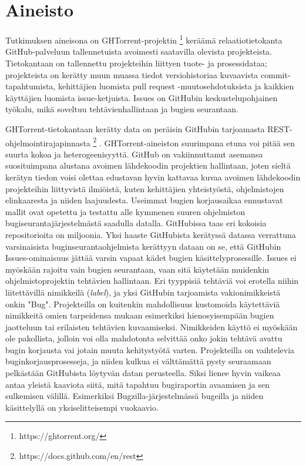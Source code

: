 \documentclass[utf8]{gradu3}
\begin{document}
\section{Aineisto}
Tutkimuksen aineisona on GHTorrent-projektin \footnote{https://ghtorrent.org/}
\parencite{Gousi13} keräämä relaatiotietokanta GitHub-palveluun tallennetuista
avoimesti saatavilla olevista projekteista. Tietokantaan on tallennettu
projekteihin liittyen tuote- ja prosessidataa; projekteista on kerätty muun
muassa tiedot versiohistoriaa kuvaavista commit-tapahtumista, kehittäjien
luomista pull request -muutosehdotuksista ja kaikkien käyttäjien luomista
issue-ketjuista. Issues on GitHubin keskustelupohjainen työkalu, mikä soveltuu
tehtävienhallintaan ja bugien seurantaan.

GHTorrent-tietokantaan kerätty data on peräisin GitHubin tarjoamasta
REST-ohjelmointirajapinnasta \footnote{https://docs.github.com/en/rest}
\parencite{Gousi13}. GHTorrent-aineiston suurimpana etuna voi pitää sen suurta
kokoa ja heterogeenisyyttä. GitHub on vakiinnuttanut asemansa suosituimpana
alustana avoimen lähdekoodin projektien hallintaan, joten sieltä kerätyn tiedon
voisi olettaa edustavan hyvin kattavaa kuvaa avoimen lähdekoodin projekteihin
liittyvistä ilmiöistä, kuten kehittäjien yhteistyöstä, ohjelmistojen
elinkaaresta ja niiden laajuudesta. Useimmat bugien korjausaikaa ennustavat
mallit ovat opetettu ja testattu alle kymmenen suuren ohjelmiston
bugiseurantajärjestelmästä saadulla datalla. GitHubissa taas eri kokoisia
repositorioita on miljoonia. Yksi haaste GitHubista kerätyssä datassa verrattuna
varsinaisista buginseurantaohjelmista kerättyyn dataan on se, että GitHubin
Issues-ominaisuus jättää varsin vapaat kädet bugien käsittelyprosessille. Issues
ei myöskään rajoitu vain bugien seurantaan, vaan sitä käytetään muidenkin
ohjelmistoprojektin tehtävien hallintaan. Eri tyyppisiä tehtäviä voi erotella
niihin liitettävillä nimikkeilä (\textit{label}), ja yksi GitHubin tarjoamista
vakionimikkeistä onkin "Bug". Projekteilla on kuitenkin mahdollisuus kustomoida
käytettäviä nimikkeitä omien tarpeidensa mukaan esimerkiksi hienosyisempään
bugien jaotteluun tai erilaisten tehtävien kuvaamiseksi. Nimikkeiden käyttö ei
myöskään ole pakollista, jolloin voi olla mahdotonta selvittää onko jokin
tehtävä avattu bugin korjausta vai jotain muuta kehitystyötä varten.
Projekteilla on vaihtelevia buginkorjausprosesseja, ja niiden kulkua ei
välttämättä pysty seuraamaan pelkästään GitHubista löytyvän datan perusteella.
Siksi lienee hyvin vaikeaa antaa yleistä kaaviota siitä, mitä tapahtuu
bugiraportin avaamisen ja sen sulkemisen välillä. Esimerkiksi
Bugzilla-järjestelmässä bugeilla ja niiden käsittelyllä on yksiselitteisempi
vuokaavio.
\end{document}
